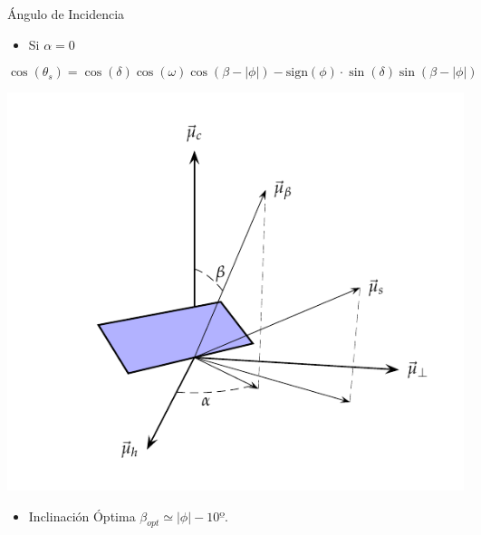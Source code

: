 \documentclass[xcolor={usenames,svgnames,dvipsnames}]{beamer}
\begin{document}
\begin{frame}[plain,label={sec:org272b0b0}]{Ángulo de Incidencia}
\begin{itemize}
\item Si \(\alpha=0\)
\end{itemize}
\[
\cos(\theta_{s}) = \cos(\delta)\cos(\omega)\cos(\beta-|\phi|)- \mathrm{sign}(\phi)\cdot\sin(\delta)\sin(\beta-|\phi|)
\]

\begin{center}
\includegraphics[height=0.6\textheight]{../figs/AngulosSistemaEstatico.pdf}
\end{center}

\begin{itemize}
\item Inclinación Óptima \(\beta_{opt} \simeq |\phi| - 10º\).
\end{itemize}
\end{frame}
\end{document}
